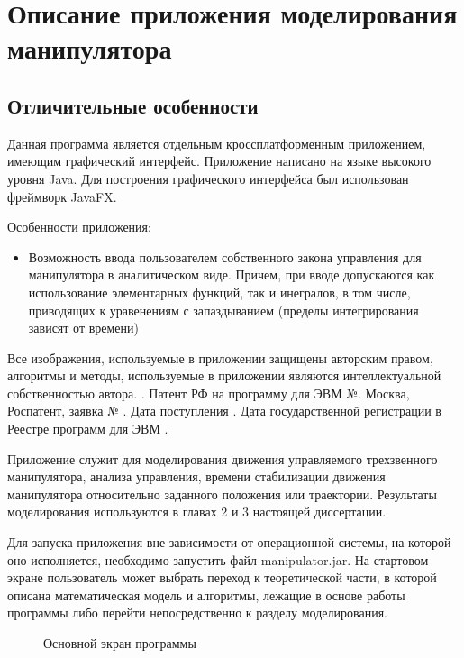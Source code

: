 \newpage
\appendix
\renewcommand{\thechapter}{\Asbuk{chapter}}
\chapter{Описание приложения моделирования манипулятора} 
\section{Отличительные особенности} \label{app1start}

Данная программа является отдельным кроссплатформенным приложением, имеющим графический интерфейс. Приложение написано на языке высокого уровня Java. Для построения графического интерфейса был использован фреймворк JavaFX.

Особенности приложения:
\begin{itemize}
\item{Возможность ввода пользователем собственного закона управления для манипулятора в аналитическом виде. Причем, при вводе допускаются как использование элементарных функций, так и инегралов, в том числе, приводящих к уравенениям с запаздыванием (пределы интегрирования зависят от времени)}
\end{itemize}

Все изображения, используемые в приложении защищены авторским правом, алгоритмы и методы, используемые в приложении являются интеллектуальной собственностью автора.  . Патент РФ на программу для ЭВМ №.  Москва, Роспатент, заявка № . Дата поступления .  Дата государственной регистрации в Реестре программ для ЭВМ . 

Приложение служит для моделирования движения управляемого трехзвенного манипулятора, анализа управления, времени стабилизации движения манипулятора относительно заданного положения или траектории. Результаты моделирования используются в главах 2 и 3 настоящей диссертации.

Для запуска приложения вне зависимости от операционной системы, на которой оно исполняется, необходимо запустить файл manipulator.jar. На стартовом экране пользователь может выбрать переход к теоретической части, в которой описана математическая модель и алгоритмы, лежащие в основе работы программы либо перейти непосредственно к разделу моделирования.

\begin{figure}[h]
\caption{Основной экран программы}
\label{ris:window}
\end{figure}

